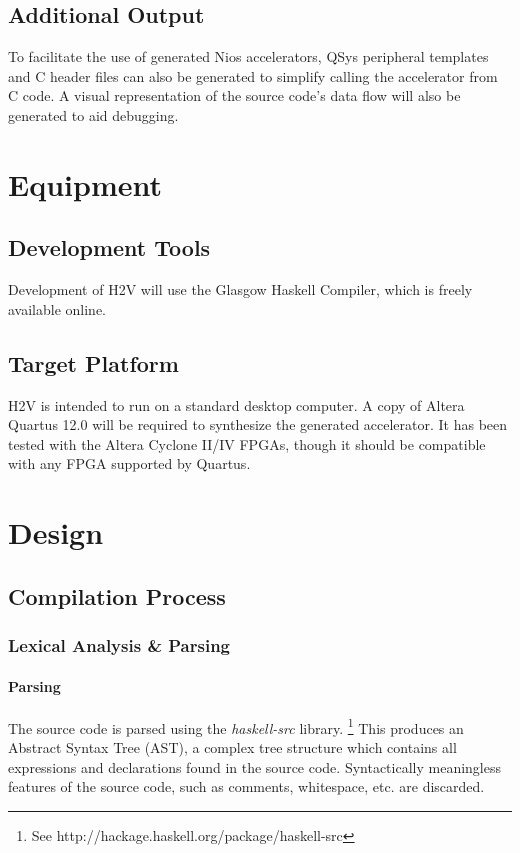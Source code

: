 \documentclass[english,onecolumn]{article}
\begin{document}
\subsection{Additional Output}
To facilitate the use of generated Nios accelerators, QSys peripheral templates and C header files can also be generated to simplify calling the accelerator from C code.
A visual representation of the source code's data flow will also be generated to aid debugging.

\section{Equipment}
\subsection{Development Tools}
Development of H2V will use the Glasgow Haskell Compiler, which is freely available online.

\subsection{Target Platform}
H2V is intended to run on a standard desktop computer. A copy of Altera Quartus 12.0 will be required to synthesize the generated accelerator. It has been tested with the Altera Cyclone II/IV FPGAs, though it should be compatible with any FPGA supported by Quartus.

\section{Design}
\subsection{Compilation Process}
\subsubsection{Lexical Analysis \& Parsing}
\paragraph{Parsing}
The source code is parsed using the \textit{haskell-src} library.%
\footnote{See http://hackage.haskell.org/package/haskell-src}
This produces an Abstract Syntax Tree (AST), a complex tree structure which contains all expressions and declarations found in the source code. Syntactically meaningless features of the source code, such as comments, whitespace, etc. are discarded.
\end{document}

